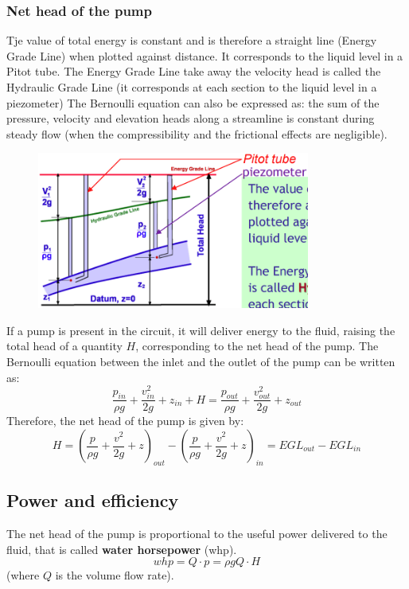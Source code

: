\documentclass[class=report, crop=false, 12pt,a4paper]{standalone}
\begin{document}
\subsubsection{Net head of the pump}
Tje value of total energy is constant and is therefore a straight line (Energy Grade Line) when plotted against distance. It corresponds to the liquid level in a Pitot tube. The Energy Grade Line take away the velocity head is called the Hydraulic Grade Line (it corresponds at each section to the liquid level in a piezometer)
The Bernoulli equation can also be expressed as: the sum of the pressure, velocity and elevation heads along a streamline is constant during steady flow (when the compressibility and the frictional effects are negligible).
\begin{figure}[H]
  \centering
  \includegraphics[width = 0.8\textwidth]{../img/gradelines.png}
\end{figure}
If a pump is present in the circuit, it will deliver energy to the fluid, raising the total head of a quantity $H$, corresponding to the net head of the pump. The Bernoulli equation between the inlet and the outlet of the pump can be written as:
\begin{equation}
  \frac{p_{in}}{\rho g} + \frac{v_{in}^2}{2g} + z_{in} + H = \frac{p_{out}}{\rho g} + \frac{v_{out}^2}{2g} + z_{out}
\end{equation}
Therefore, the net head of the pump is given by:
\begin{equation}
  H = \left( \frac{p}{\rho g} + \frac{v^2}{2g} +z \right)_{out} - \left( \frac{p}{\rho g} + \frac{v^2}{2g} +z \right)_{in} = EGL_{out} - EGL_{in}
\end{equation}
\subsection{Power and efficiency}
The net head of the pump is proportional to the useful power delivered to the fluid, that is called \textbf{water horsepower} (whp).
\begin{equation}
  whp = Q\cdot p = \rho g Q\cdot H
\end{equation}
(where $Q$ is the volume flow rate).
\end{document}
